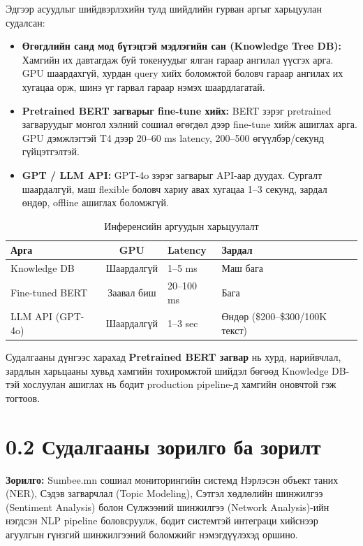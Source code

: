 \noindent Эдгээр асуудлыг шийдвэрлэхийн тулд шийдлийн гурван аргыг харьцуулан судалсан:

\begin{itemize}
    \item \textbf{Өгөгдлийн санд мод бүтэцтэй мэдлэгийн сан (Knowledge Tree DB):} Хамгийн их давтагдаж буй токенуудыг ялган гараар ангилал үүсгэх арга. GPU шаардахгүй, хурдан query хийх боломжтой боловч гараар ангилах их хугацаа орж, шинэ үг гарвал гараар нэмэх шаардлагатай.
    \item \textbf{Pretrained BERT загварыг fine-tune хийх:} BERT зэрэг pretrained загваруудыг монгол хэлний сошиал өгөгдөл дээр fine-tune хийж ашиглах арга. GPU дэмжлэгтэй T4 дээр 20--60 ms latency, 200--500 өгүүлбэр/секунд гүйцэтгэлтэй.
    \item \textbf{GPT / LLM API:} GPT-4o зэрэг загварыг API-аар дуудах. Сургалт шаардалгүй, маш flexible боловч хариу авах хугацаа 1--3 секунд, зардал өндөр, offline ашиглах боломжгүй.
\end{itemize}

\begin{table}[h!]
\centering
\renewcommand{\arraystretch}{1.4}
\begin{tabular}{|l|c|l|l|}
\hline
\textbf{Арга} & \textbf{GPU} & \textbf{Latency} & \textbf{Зардал} \\ \hline
Knowledge DB & Шаардалгүй & 1–5 ms & Маш бага \\ \hline
Fine-tuned BERT & Заавал биш & 20–100 ms & Бага \\ \hline
LLM API (GPT-4o) & Шаардалгүй & 1–3 sec & Өндөр (\$200–\$300/100K текст) \\ \hline
\end{tabular}
\caption{Инференсийн аргуудын харьцуулалт}
\end{table}

\noindent Судалгааны дүнгээс харахад \textbf{Pretrained BERT загвар} нь хурд, нарийвчлал, зардлын харьцааны хувьд хамгийн тохиромжтой шийдэл бөгөөд Knowledge DB-тэй хослуулан ашиглах нь бодит production pipeline-д хамгийн оновчтой гэж тогтоов.

\section*{0.2 Судалгааны зорилго ба зорилт}

\textbf{Зорилго:} Sumbee.mn сошиал мониторингийн системд Нэрлэсэн объект таних (NER), Сэдэв загварчлал (Topic Modeling), Сэтгэл хөдлөлийн шинжилгээ (Sentiment Analysis) болон Сүлжээний шинжилгээ (Network Analysis)-ийн нэгдсэн NLP pipeline боловсруулж, бодит системтэй интеграци хийснээр агуулгын гүнзгий шинжилгээний боломжийг нэмэгдүүлэхэд оршино.

